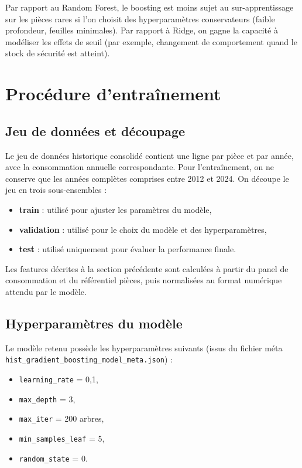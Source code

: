 \documentclass[11pt,a4paper]{article}
\begin{document}
Par rapport au Random Forest, le boosting est moins sujet au sur-apprentissage sur les pièces rares si l'on choisit des hyperparamètres conservateurs (faible profondeur, feuilles minimales). Par rapport à Ridge, on gagne la capacité à modéliser les effets de seuil (par exemple, changement de comportement quand le stock de sécurité est atteint).

\section{Procédure d'entraînement}

\subsection{Jeu de données et découpage}

Le jeu de données historique consolidé contient une ligne par pièce et par année, avec la consommation annuelle correspondante. Pour l'entraînement, on ne conserve que les années complètes comprises entre 2012 et 2024. On découpe le jeu en trois sous-ensembles :

\begin{itemize}
  \item \textbf{train} : utilisé pour ajuster les paramètres du modèle,
  \item \textbf{validation} : utilisé pour le choix du modèle et des hyperparamètres,
  \item \textbf{test} : utilisé uniquement pour évaluer la performance finale.
\end{itemize}

Les features décrites à la section précédente sont calculées à partir du panel de consommation et du référentiel pièces, puis normalisées au format numérique attendu par le modèle.

\subsection{Hyperparamètres du modèle}

Le modèle retenu possède les hyperparamètres suivants (issus du fichier méta \texttt{hist\_gradient\_boosting\_model\_meta.json}) :

\begin{itemize}
  \item \texttt{learning\_rate} = 0{,}1,
  \item \texttt{max\_depth} = 3,
  \item \texttt{max\_iter} = 200 arbres,
  \item \texttt{min\_samples\_leaf} = 5,
  \item \texttt{random\_state} = 0.
\end{itemize}
\end{document}
